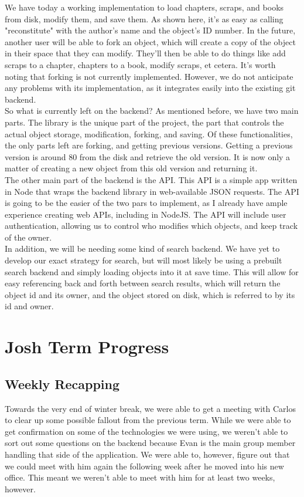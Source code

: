\documentclass[onecolumn, draftclsnofoot,10pt, compsoc]{IEEEtran}
\begin{document}
\medskip
\noindent We have today a working
implementation to load chapters, scraps, and books from disk, modify them, and
save them. As shown here, it's as easy as calling "reconstitute" with the
author's name and the object's ID number. In the future, another user will be
able to fork an object, which will create a copy of the object in their space
that they can modify. They'll then be able to do things like add scraps to a
chapter, chapters to a book, modify scraps, et cetera. It's worth noting that
forking is not currently implemented. However, we do not anticipate any problems
with its implementation, as it integrates easily into the existing git backend. \\

\noindent So what is currently left on the backend? As mentioned before, we have 
two main parts. The library is the unique part of the project, the part that controls
the actual object storage, modification, forking, and saving. Of these
functionalities, the only parts left are forking, and getting previous versions.
Getting a previous version is around 80%
from the disk and retrieve the old version. It is now only a matter of creating
a new object from this old version and returning it.\\

\noindent The other main part of the backend is the API. This API is a simple app written
in Node that wraps the backend library in web-available JSON requests. The API
is going to be the easier of the two pars to implement, as I already have ample
experience creating web APIs, including in NodeJS. The API will include user
authentication, allowing us to control who modifies which objects, and keep
track of the owner.\\

\noindent In addition, we will be needing some kind of search backend. We have yet to
develop our exact strategy for search, but will most likely be using a prebuilt
search backend and simply loading objects into it at save time. This will allow
for easy referencing back and forth between search results, which will return
the object id and its owner, and the object stored on disk, which is referred to
by its id and owner.\\
\newpage
\section{Josh Term Progress}
\subsection{Weekly Recapping}
\noindent Towards the very end of winter break, we were able to get a meeting with Carlos to clear
up some possible fallout from the previous term. While we were able to get
confirmation on some of the technologies we were using, we weren't able to sort out some
questions on the backend because Evan is the main group member handling that side of the
application. We were able to, however, figure out that we could meet with
him again the following week after he moved into his new office. This meant we weren't
able to meet with him for at least two weeks, however. \\
\end{document}
